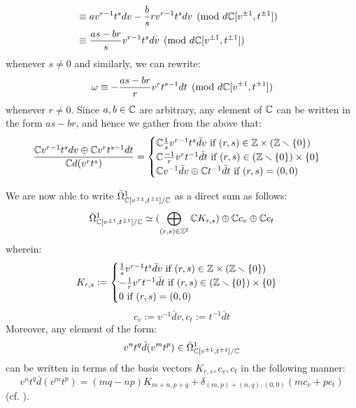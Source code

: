 \begin{example}
$$\begin{aligned}
                        \\
                        & \equiv a v^{r - 1} t^s dv - \frac{b}{s} r v^{r - 1} t^s dv \pmod{d\mathbb{C}[v^{\pm 1}, t^{\pm 1}]}
                        \\
                        & \equiv \frac{as - br}{s} v^{r - 1} t^s dv \pmod{d\mathbb{C}[v^{\pm 1}, t^{\pm 1}]}
                    \end{aligned}
                $$
            whenever $s \not = 0$ and similarly, we can rewrite:
                $$\omega \equiv -\frac{as - br}{r} v^r t^{s - 1} dt \pmod{d\mathbb{C}[v^{\pm 1}, t^{\pm 1}]}$$
            whenever $r \not = 0$. Since $a, b \in \mathbb{C}$ are arbitrary, any element of $\mathbb{C}$ can be written in the form $as - br$, and hence we gather from the above that:
                $$
                    \frac{ \bbC v^{r - 1} t^s dv \oplus \bbC v^r t^{s - 1} dt }{ \bbC d(v^r t^s) } =
                    \begin{cases}
                        \text{$\bbC \frac1s v^{r - 1} t^s \bar{d}v$ if $(r, s) \in \Z \x (\Z \setminus \{0\})$}
                        \\
                        \text{$\bbC \frac{-1}{r} v^r t^{-1} \bar{d}t$ if $(r, s) \in (\Z \setminus \{0\}) \x \{0\}$}
                        \\
                        \text{$\bbC v^{-1}\bar{d}v \oplus \bbC t^{-1} \bar{d}t$ if $(r, s) = (0, 0)$}
                    \end{cases}
                $$
            
            We are now able to write $\bar{\Omega}^1_{\mathbb{C}[v^{\pm 1}, t^{\pm 1}]/\mathbb{C}}$ as a direct sum as follows:
                $$\bar{\Omega}^1_{\mathbb{C}[v^{\pm 1}, t^{\pm 1}]/\mathbb{C}} \simeq ( \bigoplus_{(r, s) \in \mathbb{Z}^2} \mathbb{C} K_{r, s}) \oplus \mathbb{C} c_v \oplus \mathbb{C} c_t$$
            wherein:
                $$
                    K_{r, s} :=
                    \begin{cases}
                        \text{$\frac1s v^{r - 1} t^s \bar{d}v$ if $(r, s) \in \Z \x (\Z \setminus \{0\})$}
                        \\
                        \text{$-\frac1r v^r t^{-1} \bar{d}t$ if $(r, s) \in (\Z \setminus \{0\}) \x \{0\}$}
                        \\
                        \text{$0$ if $(r, s) = (0, 0)$}
                    \end{cases}
                $$
                $$c_v := v^{-1} \bar{d}v, c_t := t^{-1} \bar{d}t$$
            Moreover, any element of the form:
                $$v^n t^q \bar{d}(v^m t^p) \in \bar{\Omega}^1_{\mathbb{C}[v^{\pm 1}, t^{\pm 1}]/\mathbb{C}}$$
            can be written in terms of the basis vectors $K_{r, s}, c_v, c_t$ in the following manner:
                $$v^n t^q \bar{d}(v^m t^p) = (mq - np) K_{m + n, p + q} + \delta_{(m, p) + (n, q), (0, 0)} ( m c_v + p c_t )$$
            (cf. \cite[p. 35]{wendlandt_formal_shift_operators_on_yangian_doubles}).


\end{example}
